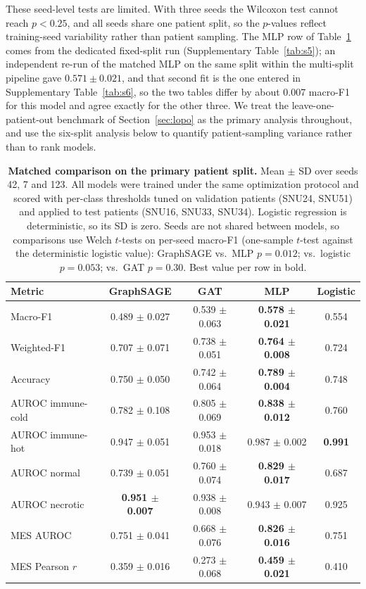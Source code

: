 \documentclass[11pt,letterpaper]{article}
\begin{document}
These seed-level tests are limited. With three seeds the Wilcoxon test cannot reach $p < 0.25$, and all seeds share one patient split, so the $p$-values reflect training-seed variability rather than patient sampling. The MLP row of Table~\ref{tab:comparison} comes from the dedicated fixed-split run (Supplementary Table~\ref{tab:s5}); an independent re-run of the matched MLP on the same split within the multi-split pipeline gave $0.571 \pm 0.021$, and that second fit is the one entered in Supplementary Table~\ref{tab:s6}, so the two tables differ by about 0.007 macro-F1 for this model and agree exactly for the other three. We treat the leave-one-patient-out benchmark of Section~\ref{sec:lopo} as the primary analysis throughout, and use the six-split analysis below to quantify patient-sampling variance rather than to rank models.

\begin{table}[H]
\centering
\caption{\textbf{Matched comparison on the primary patient split.} Mean $\pm$ SD over seeds 42, 7 and 123. All models were trained under the same optimization protocol and scored with per-class thresholds tuned on validation patients (SNU24, SNU51) and applied to test patients (SNU16, SNU33, SNU34). Logistic regression is deterministic, so its SD is zero. Seeds are not shared between models, so comparisons use Welch $t$-tests on per-seed macro-F1 (one-sample $t$-test against the deterministic logistic value): GraphSAGE vs.\ MLP $p = 0.012$; vs.\ logistic $p = 0.053$; vs.\ GAT $p = 0.30$. Best value per row in bold.}
\label{tab:comparison}
\small
\begin{tabular}{lcccc}
\toprule
\textbf{Metric} & \textbf{GraphSAGE} & \textbf{GAT} & \textbf{MLP} & \textbf{Logistic} \\
\midrule
Macro-F1            & 0.489 $\pm$ 0.027 & 0.539 $\pm$ 0.063 & \textbf{0.578 $\pm$ 0.021} & 0.554 \\
Weighted-F1         & 0.707 $\pm$ 0.071 & 0.738 $\pm$ 0.051 & \textbf{0.764 $\pm$ 0.008} & 0.724 \\
Accuracy            & 0.750 $\pm$ 0.050 & 0.742 $\pm$ 0.064 & \textbf{0.789 $\pm$ 0.004} & 0.748 \\
AUROC immune-cold   & 0.782 $\pm$ 0.108 & 0.805 $\pm$ 0.069 & \textbf{0.838 $\pm$ 0.012} & 0.760 \\
AUROC immune-hot    & 0.947 $\pm$ 0.051 & 0.953 $\pm$ 0.018 & 0.987 $\pm$ 0.002 & \textbf{0.991} \\
AUROC normal        & 0.739 $\pm$ 0.051 & 0.760 $\pm$ 0.074 & \textbf{0.829 $\pm$ 0.017} & 0.687 \\
AUROC necrotic      & \textbf{0.951 $\pm$ 0.007} & 0.938 $\pm$ 0.008 & 0.943 $\pm$ 0.007 & 0.925 \\
MES AUROC           & 0.751 $\pm$ 0.041 & 0.668 $\pm$ 0.076 & \textbf{0.826 $\pm$ 0.016} & 0.751 \\
MES Pearson $r$     & 0.359 $\pm$ 0.016 & 0.273 $\pm$ 0.068 & \textbf{0.459 $\pm$ 0.021} & 0.410 \\
\bottomrule
\end{tabular}
\end{table}
\end{document}
